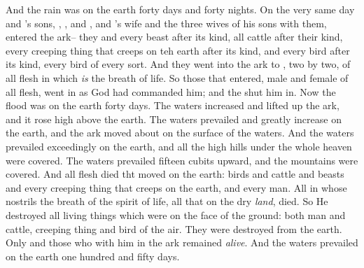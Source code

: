 \bverse And the rain was on the earth forty days and forty nights.
\bverse On the very same day  and 's sons, , , and , and 's wife and the three wives of his sons with them, entered the ark--
\bverse they and every beast after its kind, all cattle after their kind, every creeping thing that creeps on teh earth after its kind, and every bird after its kind, every bird of every sort.
\bverse And they went into the ark to , two by two, of all flesh in which \textit{is} the breath of life.
\bverse So those that entered, male and female of all flesh, went in as God had commanded him; and the \lord shut him in.
\bverse Now the flood was on the earth forty days. The waters increased and lifted up the ark, and it rose high above the earth.
\bverse The waters prevailed and greatly increase on the earth, and the ark moved about on the surface of the waters.
\bverse And the waters prevailed exceedingly on the earth, and all the high hills under the whole heaven were covered.
\bverse The waters prevailed fifteen cubits upward, and the mountains were covered.
\bverse And all flesh died tht moved on the earth: birds and cattle and beasts and every creeping thing that creeps on the earth, and every man.
\bverse All in whose nostrils \was the breath of the spirit of life, all that \was on the dry \textit{land}, died.
\bverse So He destroyed all living things which were on the face of the ground: both man and cattle, creeping thing and bird of the air. They were destroyed from the earth. Only  and those who \were with him in the ark remained \textit{alive}.
\bverse And the waters prevailed on the earth one hundred and fifty days.

